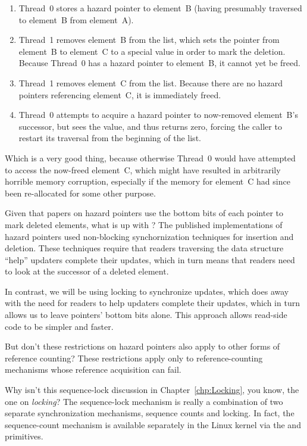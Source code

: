 \begin{enumerate}
	\begin{enumerate}
	\item	Thread~0 stores a hazard pointer to element~B
		(having presumably traversed to element~B from element~A).
	\item	Thread~1 removes element~B from the list, which sets
		the pointer from element~B to element~C to a special
		 value in order to mark the deletion.
		Because Thread~0 has a hazard pointer to element~B,
		it cannot yet be freed.
	\item	Thread~1 removes element~C from the list.
		Because there are no hazard pointers referencing element~C,
		it is immediately freed.
	\item	Thread~0 attempts to acquire a hazard pointer to
		now-removed element~B's successor, but sees the
		 value, and thus returns zero,
		forcing the caller to restart its traversal from the
		beginning of the list.
	\end{enumerate}

	Which is a very good thing, because otherwise Thread~0 would
	have attempted to access the now-freed element~C,
	which might have resulted in arbitrarily horrible
	memory corruption, especially if the memory for
	element~C had since been re-allocated for some other
	purpose.

\QuickQ{}
	Given that papers on hazard pointers use the bottom bits
	of each pointer to mark deleted elements, what is up with
	?
\QuickA{}
	The published implementations of hazard pointers used
	non-blocking synchornization techniques for insertion
	and deletion.
	These techniques require that readers traversing the
	data structure ``help'' updaters complete their updates,
	which in turn means that readers need to look at the successor
	of a deleted element.

	In contrast, we will be using locking to synchronize updates,
	which does away with the need for readers to help updaters
	complete their updates, which in turn allows us to leave
	pointers' bottom bits alone.
	This approach allows read-side code to be simpler and faster.

\QuickQ{}
	But don't these restrictions on hazard pointers also apply
	to other forms of reference counting?
\QuickA{}
	These restrictions apply only to reference-counting mechanisms whose
	reference acquisition can fail.

\QuickQ{}
	Why isn't this sequence-lock discussion in Chapter~\ref{chp:Locking},
	you know, the one on \emph{locking}?
\QuickA{}
	The sequence-lock mechanism is really a combination of two
	separate synchronization mechanisms, sequence counts and
	locking.
	In fact, the sequence-count mechanism is available separately
	in the Linux kernel via the
	 and 
	primitives.


\end{enumerate}
